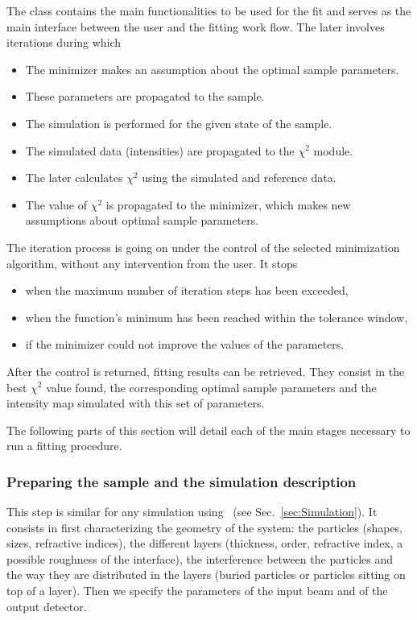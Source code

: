 The class  contains the main functionalities to be used for the fit
and serves as the main interface between the user and the fitting work flow.
The later involves iterations during which

\begin{itemize}
\item The minimizer makes an assumption about the optimal sample parameters.
\item These parameters are propagated to the sample.
\item The simulation is performed for the given state of the sample.
\item The simulated data (intensities) are propagated to the $\chi^2$ module.
\item The later calculates $\chi^2$ using the simulated and reference data.
\item The value of $\chi^2$ is propagated to the minimizer, which makes new assumptions about optimal sample parameters.
\end{itemize}

The iteration process is going on under the control of the selected minimization
algorithm, without any intervention from the
user. It stops
\begin{itemize}
\item when the maximum number of iteration steps has been exceeded,
\item when the function's minimum has been reached within the tolerance window,
\item if the minimizer could not improve the values of the parameters.
\end{itemize}

After the control is returned, fitting results can be retrieved.
They consist in the best $\chi^2$ value found, the corresponding
optimal sample parameters and the intensity map simulated with this set of parameters.

The following parts of this section will detail each of
the main stages necessary to run a fitting procedure.


\subsubsection{Preparing the sample and the simulation description}

This step is similar for any simulation using \BornAgain\ (see Sec.~\ref{sec:Simulation}). It consists in first characterizing  the geometry of the system: the particles
(shapes, sizes, refractive
indices), the different layers (thickness,
order, refractive index, a possible roughness of the interface), the
interference between the particles and the way they are distributed in
the layers (buried particles or particles sitting on top of a
layer).
Then we specify the parameters of the input beam and of the
output detector.


